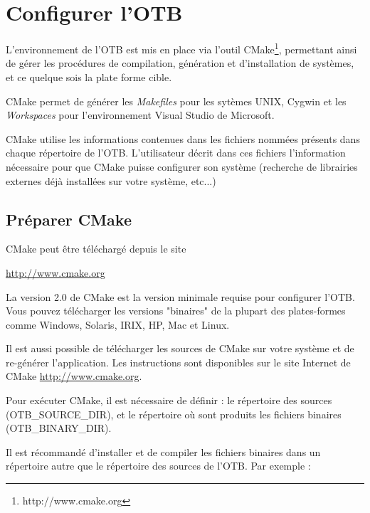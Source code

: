 \section{Configurer l'OTB}
\label{sec:ConfigurerOTB}

 
L'environnement de l'OTB est mis en place via l'outil CMake\footnote{http://www.cmake.org}, 
permettant ainsi de g\'{e}rer les proc\'{e}dures de compilation, g\'{e}n\'{e}ration et d'installation de syst\`{e}mes, et ce quelque sois la plate forme cible.

CMake permet de g\'{e}n\'{e}rer les \emph{Makefiles} pour les syt\`{e}mes UNIX, Cygwin et les \emph{Workspaces} pour l'environnement Visual Studio de Microsoft.

CMake utilise les informations contenues dans les fichiers nomm\'{e}es  pr\'{e}sents dans chaque r\'{e}pertoire de l'OTB.
L'utilisateur d\'{e}crit dans ces fichiers l'information n\'{e}cessaire pour que CMake puisse configurer son syst\`{e}me (recherche de librairies externes d\'{e}j\`{a} install\'{e}es sur votre syst\`{e}me, etc...)

\subsection{Pr\'{e}parer CMake}
\label{sec:CMakeforOTB}
 

CMake peut \^{e}tre t\'{e}l\'{e}charg\'{e} depuis le site
\begin{center} 
  \url{http://www.cmake.org}
\end{center}

La version 2.0 de CMake est la version minimale requise pour configurer l'OTB.
Vous pouvez t\'{e}l\'{e}charger les versions "binaires" de la plupart des plates-formes comme Windows, Solaris, IRIX, HP, Mac et Linux.

Il est aussi possible de t\'{e}l\'{e}charger les sources de CMake sur votre syst\`{e}me et de re-g\'{e}n\'{e}rer l'application. 
Les instructions sont disponibles sur le site Internet de CMake \url{http://www.cmake.org}.


Pour ex\'{e}cuter CMake, il est n\'{e}cessaire de d\'{e}finir :
le r\'{e}pertoire des sources (OTB\_SOURCE\_DIR), 
et le r\'{e}pertoire o\`{u} sont produits les fichiers binaires (OTB\_BINARY\_DIR). 

Il est r\'{e}command\'{e} d'installer et de compiler les fichiers binaires dans un r\'{e}pertoire autre que le r\'{e}pertoire des sources de l'OTB. 
Par exemple :

